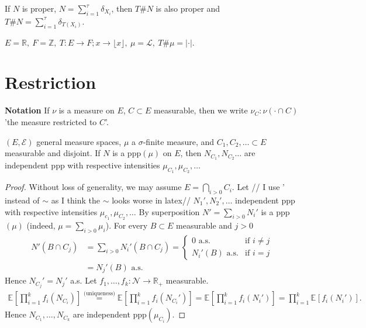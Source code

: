 \begin{rmk}
	If $N$ is proper, $N=\sum_{i=1}^{\tau} \delta_{X_i}$, then $T\#N$ is also proper and $T\#N = \sum_{i=1}^{\tau} \delta_{T(X_i)}$.
\end{rmk}

\begin{ex}[]
	$E=\mathbb{R},\ F=\mathbb{Z},\ T:E \to F; x \to \lfloor x \rfloor,\ \mu= \mathcal{L},\ T\#\mu=|\cdot |$.
\end{ex}

\section{Restriction}
\noindent \textbf{Notation} If $\nu $ is a measure on $E$, $C \subset E$ measurable, then we write $\nu _C: \nu(\cdot \cap C)$ 'the measure restricted to $C$'.
\begin{theorem}[Restriction]
	$(E, \mathcal{E})$ general measure spaces, $\mu $ a $\sigma $-finite measure, and $C_1, C_2, \ldots  \subset E$ measurable and disjoint. If $N$ is a  ppp$(\mu)$ on  $E$, then $N_{C_1}, N_{C_2} \ldots $ are independent ppp with respective intensities $\mu_{C_1}, \mu_{C_2}, \ldots $	
\end{theorem}
\begin{proof}
	Without loss of generality, we may assume $E = \bigcap_{i> 0}C_i$. Let {\color{blue}// I use ' instead of $\sim$ as I think the $\sim$ looks worse in latex//} $N_1', N_2', \ldots$ independent ppp with respective intensities $\mu _{c_1}, \mu _{C_2},\ldots$ By superposition $N' = \sum_{i> 0}^{} N_i'$ is a ppp$(\mu )$ (indeed, $\mu = \sum_{i> 0}^{} \mu _i$). For every $B\subset E$ measurable and $j> 0$ 
	\begin{align}
		N'(B \cap C_j) &= \sum_{i> 0}^{} N_i'(B \cap C_j) =
		\begin{cases}
			0 \textrm{ a.s.} & \textrm{if }i \neq j \\
			N_i'(B) \textrm{ a.s.} & \textrm{if } i=j
		\end{cases} \\
			       &= N_j'(B) \textrm{ a.s.}	
	\end{align}
Hence $N_{C_j}' = N_j'$ a.s. Let $f_1, \ldots, f_k: \mathcal{N} \to \mathbb{R}_+$ measurable. 
\begin{align}
	\mathbb{E}_{} \left[ \prod_{i=1}^{k}f_i(N_{C_i}) \right]  \stackrel{\textrm{(uniqueness)}}{=} 
	\mathbb{E}_{} \left[ \prod_{i=1}^{k}f_i(N_{C_i}') \right] = \mathbb{E}_{} \left[ \prod_{i=1}^{k}f_i(N_i') \right]= \prod_{i=1}^{k}\mathbb{E}_{} \left[ f_i(N_i') \right] . 
\end{align}
Hence $N_{C_1}, \ldots, N_{C_k}$ are independent ppp$(\mu _{C_i})$.
\end{proof}



